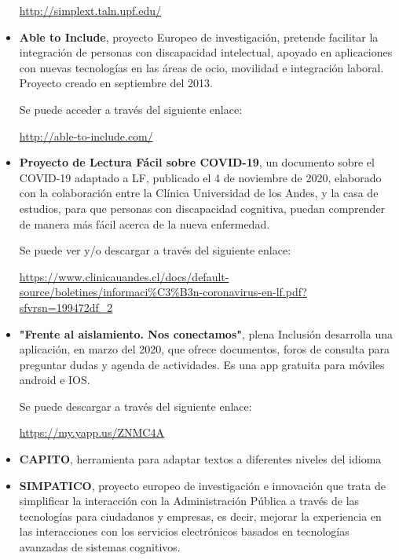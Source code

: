 \begin{itemize}
\href{http://simplext.taln.upf.edu/}{http://simplext.taln.upf.edu/}

\item
{\textbf{Able to Include}}, proyecto Europeo de investigación, pretende facilitar la integración de personas con discapacidad intelectual, apoyado en aplicaciones con nuevas tecnologías en las áreas de ocio, movilidad e integración laboral. Proyecto creado en septiembre del 2013.

Se puede acceder a través del siguiente enlace:

\href{http://able-to-include.com/}{http://able-to-include.com/}

\item
{\textbf{Proyecto de Lectura Fácil sobre COVID-19}}, un documento sobre el COVID-19 adaptado a LF, publicado el 4 de noviembre de 2020, elaborado con la colaboración entre la Clínica Universidad de los Andes, y la casa de estudios, para que personas con discapacidad cognitiva, puedan comprender de manera más fácil acerca de la nueva enfermedad.

Se puede ver y/o descargar a través del siguiente enlace:

\href{https://www.clinicauandes.cl/docs/default-source/boletines/informaci\%C3\%B3n-coronavirus-en-lf.pdf?sfvrsn=199472df\_2}{https://www.clinicauandes.cl/docs/default-source/boletines/informaci\%C3\%B3n-coronavirus-en-lf.pdf?sfvrsn=199472df\_2}

\item
{\textbf{"Frente al aislamiento. Nos conectamos"}}, plena Inclusión desarrolla una aplicación, en marzo del 2020, que ofrece documentos, foros de consulta para preguntar dudas y agenda de actividades. Es una app gratuita para móviles android e IOS. 

Se puede descargar a través del siguiente enlace:

\href{https://my.yapp.us/ZNMC4A}{https://my.yapp.us/ZNMC4A}

\item
{\textbf{CAPITO}}, herramienta para adaptar textos a diferentes niveles del idioma

\item
{\textbf{SIMPATICO}}, proyecto europeo de investigación e innovación que trata de simplificar la interacción con la Administración Pública a través de las tecnologías para ciudadanos y empresas, es decir, mejorar la experiencia en las interacciones con los servicios electrónicos basados en tecnologías avanzadas de sistemas cognitivos. 


\end{itemize}
